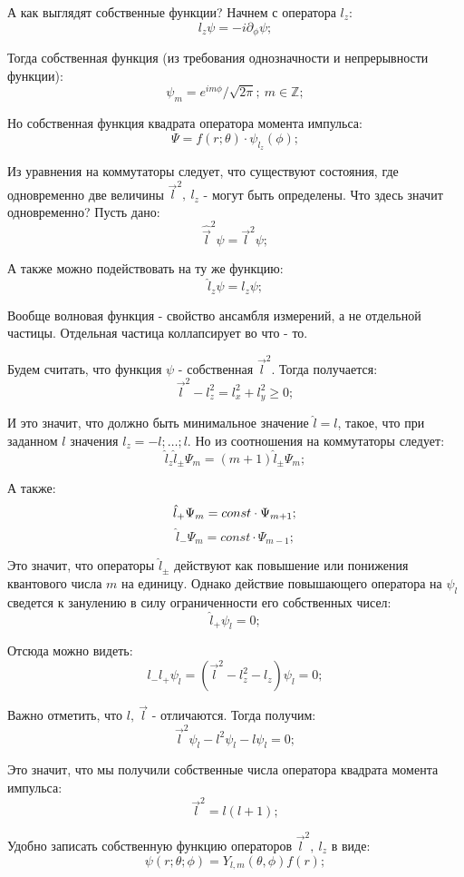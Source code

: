 \documentclass[a4paper, 14pt, russian]{article}
\newcommand{\be}{\begin{equation}}
\newcommand{\ee}{\end{equation}}
\newcommand{\pa}{\partial}
\begin{document}
	А как выглядят собственные функции? Начнем с оператора $l_z$:
	\be
		l_z \psi = -i \pa_\phi \psi;
	\ee

	Тогда собственная функция (из требования однозначности
	и непрерывности функции):
	\be
		\psi_m = e^{i m \phi} / \sqrt{2\pi};~ m\in \mathbb{Z};
	\ee

	Но собственная функция квадрата оператора момента импульса:
	\be
		\Psi = f(r;\theta) \cdot \psi_{l_z}(\phi);
	\ee

	Из уравнения на коммутаторы следует, что существуют состояния, 
	где одновременно две величины ${\vec l}^2,~l_z$ - могут быть
	определены. Что здесь значит одновременно? Пусть дано:
	\be
		\hat{\vec l}^2 \psi = {\vec l}^2 \psi;
	\ee

	А также можно подействовать на ту же функцию:
	\be
		\hat{l}_z \psi = l_z \psi;
	\ee

	Вообще волновая функция - свойство ансамбля измерений,
	а не отдельной частицы. Отдельная частица коллапсирует во
	что - то.

	Будем считать, что функция $\psi$ - собственная ${\vec l}^2$.
	Тогда получается:
	\be
		{\vec l}^2 - l_z^2 = l_x^2 + l_y^2 \ge 0;
	\ee

	И это значит, что должно быть минимальное значение $\hat l = l$,
	такое, что при заданном $l$ значения $l_z  = -l;\hdots; l$.
	Но из соотношения на коммутаторы следует:
	\be
		\hat{l}_z \hat{l}_{\pm} \Psi_m = (m+1) \hat{l}_{\pm} \Psi_m;
	\ee

	А также:
	\be
		\hat{l}_{+} \Psi_m = const \cdot \Psi_{m+1};\\
	\ee
	\be
		\hat{l}_{-} \Psi_m = const \cdot \Psi_{m-1};
	\ee

	Это значит, что операторы $\hat{l}_{\pm}$ действуют как повышение или
	понижения квантового числа $m$ на единицу.
	Однако действие повышающего оператора на $\psi_l$ сведется
	к занулению в силу ограниченности его собственных чисел:
	\be
		\hat{l}_{+} \psi_l = 0;
	\ee

	Отсюда можно видеть:
	\be
		l_{-} l_{+} \psi_l = ({\vec l}^2 - l_z^2 - l_z) \psi_l = 0;
	\ee

	Важно отметить, что $l,~\vec{l}$ - отличаются. Тогда получим:
	\be
		{\vec l}^2 \psi_l - l^2 \psi_l -l \psi_l = 0;
	\ee

	Это значит, что мы получили собственные числа оператора квадрата 
	момента импульса:
	\be
		{\vec l}^2 = l(l+1);
	\ee

	Удобно записать собственную функцию операторов ${\vec l}^2,~l_z$ в виде:
	\be
		\psi(r; \theta; \phi) = Y_{l,m}(\theta, \phi) f(r);
	\ee
\end{document}

